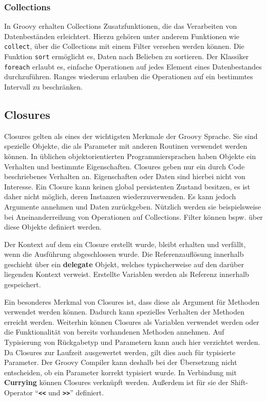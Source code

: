 \subsubsection{Collections}
In Groovy erhalten Collections Zusatzfunktionen, die das Verarbeiten von Datenbeständen erleichtert.
Hierzu gehören unter anderem Funktionen wie \texttt{collect}, über die Collections mit einem Filter versehen werden können.
Die Funktion \texttt{sort} ermöglicht es, Daten nach Belieben zu sortieren. Der Klassiker \texttt{foreach} erlaubt es, einfache Operationen auf jedes Element eines Datenbestandes durchzuführen. 
Ranges wiederum erlauben die Operationen auf ein bestimmtes Intervall zu beschränken.


\subsection{Closures}
Closures gelten als eines der wichtigsten Merkmale der Groovy Sprache. Sie sind spezielle Objekte, die als Parameter mit anderen Routinen verwendet werden können. In üblichen objektorientierten Programmiersprachen haben Objekte ein Verhalten und bestimmte Eigenschaften. Closures geben nur ein durch Code beschriebenes Verhalten an. Eigenschaften oder Daten sind hierbei nicht von Interesse. Ein Closure kann keinen global persistenten Zustand besitzen, es ist daher nicht möglich, deren Instanzen wiederzuverwenden.
Es kann jedoch Argumente annehmen und Daten zurückgeben.
Nützlich werden sie beispielsweise bei Aneinanderreihung von Operationen auf Collections.
Filter können bspw. über diese Objekte definiert werden.

Der Kontext auf dem ein Closure erstellt wurde, bleibt erhalten und verfällt, wenn die Ausführung abgeschlossen wurde. 
Die Referenzauflösung innerhalb geschieht über ein \textbf{delegate} Objekt, welches typischerweise auf den darüber liegenden Kontext verweist.
Erstellte Variablen werden als Referenz innerhalb gespeichert.

Ein besonderes Merkmal von Closures ist, dass diese als Argument für Methoden verwendet werden können. 
Dadurch kann spezielles Verhalten der Methoden erreicht werden.
Weiterhin können Closures als Variablen verwendet werden oder die Funktionalität von bereits vorhandenen Methoden annehmen. 
Auf Typisierung von Rückgabetyp und Parametern kann auch hier verzichtet werden.
Da Closures zur Laufzeit ausgewertet werden, gilt dies auch für typisierte Parameter. 
Der Groovy Compiler kann deshalb bei der Übersetzung nicht entscheiden, ob ein Parameter korrekt typisiert wurde.
In Verbindung mit \textbf{Currying} können Closures verknüpft werden. 
Außerdem ist für sie der Shift-Operator \enquote{\textbf{\texttt{<<}} und \textbf{\texttt{>>}}} definiert.

